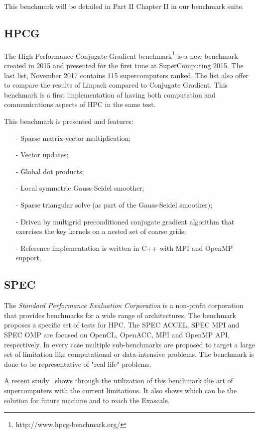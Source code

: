 This benchmark will be detailed in Part II Chapter II in our benchmark suite. 

\subsection{HPCG}
The High Performance Conjugate Gradient benchmark\footnote{http://www.hpcg-benchmark.org/} is a new benchmark created in 2015 and presented for the first time at SuperComputing 2015. 
The last list, November 2017 contains 115 supercomputers ranked. 
The list also offer to compare the results of Linpack compared to Conjugate Gradient. 
This benchmark is a first implementation of having both computation and 
communications aspects of HPC in the same test. 

This benchmark is presented and features:
\begin{itemize}[noitemsep,nolistsep]
\item[-] Sparse matrix-vector multiplication;
\item[-] Vector updates;
\item[-] Global dot products;
\item[-] Local symmetric Gauss-Seidel smoother;
\item[-] Sparse triangular solve (as part of the Gauss-Seidel smoother);
\item[-] Driven by multigrid preconditioned conjugate gradient algorithm that exercises the key kernels on a nested set of coarse grids;
\item[-] Reference implementation is written in C++ with MPI and OpenMP support.\\
\end{itemize}

\subsection{SPEC}
The \textit{Standard Performance Evaluation Corporation} is a non-profit corporation that provides benchmarks for a wide range of architectures. 
The benchmark proposes a specific set of tests for HPC.
The SPEC ACCEL, SPEC MPI and SPEC OMP are focused on OpenCL, OpenACC, MPI and OpenMP API, respectively. 
In every case multiple sub-benchmarks are proposed to target a large set of limitation like computational or data-intensive problems. 
The benchmark is done to be representative of "real life" problems. 

A recent study~\cite{8430508} shows through the utilization of this benchmark the art of supercomputers with the current limitations. 
It also shows which can be the solution for future machine and to reach the Exascale.\\

